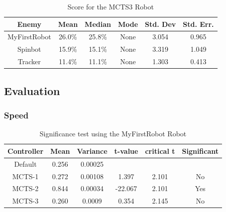 \begin{table}
\begin{center}
\renewcommand{\arraystretch}{1.3}
\caption{Score for the MCTS3 Robot}
\label{table-MCTS1-score}
\begin{tabular}{|c | c | c |c | c| c |}
\hline
Enemy & Mean & Median & Mode & Std. Dev & Std. Err.\\
\hline
MyFirstRobot & 26.0\% & 25.8\% & None & 3.054 & 0.965\\
\hline
Spinbot & 15.9\% & 15.1\% & None & 3.319 & 1.049  \\
\hline
Tracker & 11.4\% & 11.1\% & None & 1.303 & 0.413 \\
\hline
\end{tabular}
\end{center}
\end{table}

\subsection{Evaluation}


\subsubsection{Speed}

\begin{table}
\begin{center}
\renewcommand{\arraystretch}{1}
\caption{Significance test using the MyFirstRobot Robot}
\label{table-MFS-significance}
\begin{tabular}{|c | c | c |c | c | c |}
\hline
Controller & Mean & Variance & t-value & critical t & Significant\\
\hline
Default & 0.256 & 0.00025 & & &\\
\hline
MCTS-1 & 0.272 & 0.00108 & 1.397 & 2.101 & No\\
\hline
MCTS-2 & 0.844 & 0.00034 & -22.067 & 2.101 & Yes\\
\hline
MCTS-3 & 0.260 & 0.0009 & 0.354 & 2.145 & No\\
\hline
\end{tabular}
\end{center}
\end{table}


